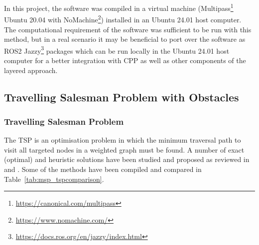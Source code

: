In this project, the software was compiled in a virtual machine (Multipass\footnote{\url{https://canonical.com/multipass}} Ubuntu 20.04 with NoMachine\footnote{\url{https://www.nomachine.com/}}) installed in an Ubuntu 24.01 host computer. The computational requirement of the software was sufficient to be run with this method, but in a real scenario it may be beneficial to port over the software as ROS2 Jazzy\footnote{\url{https://docs.ros.org/en/jazzy/index.html}} packages which can be run locally in the Ubuntu 24.01 host computer for a better integration with \gls{CPP} as well as other components of the layered approach. 

\subsection{Travelling Salesman Problem with Obstacles}
\label{sec:msp_tspo}

\subsubsection{Travelling Salesman Problem}

The \gls{TSP} is an optimisation problem in which the minimum traversal path to visit all targeted nodes in a weighted graph must be found. A number of exact (optimal) and heuristic solutions have been studied and proposed as reviewed in \cite{laporte1992tsp} and \cite{zhang2023tsp}. Some of the methods have been compiled and compared in Table~\ref{tab:msp_tspcomparison}.  

